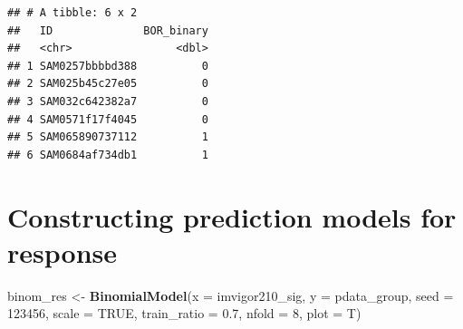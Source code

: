 \documentclass[
  12pt,
]{book}
\newenvironment{Shaded}{\begin{snugshade}}{\end{snugshade}}
\newcommand{\AttributeTok}[1]{\textcolor[rgb]{0.13,0.29,0.53}{#1}}
\newcommand{\ConstantTok}[1]{\textcolor[rgb]{0.56,0.35,0.01}{#1}}
\newcommand{\DecValTok}[1]{\textcolor[rgb]{0.00,0.00,0.81}{#1}}
\newcommand{\FloatTok}[1]{\textcolor[rgb]{0.00,0.00,0.81}{#1}}
\newcommand{\FunctionTok}[1]{\textcolor[rgb]{0.13,0.29,0.53}{\textbf{#1}}}
\newcommand{\NormalTok}[1]{#1}
\newcommand{\OtherTok}[1]{\textcolor[rgb]{0.56,0.35,0.01}{#1}}
\newcommand{\SpecialCharTok}[1]{\textcolor[rgb]{0.81,0.36,0.00}{\textbf{#1}}}
\newcommand{\StringTok}[1]{\textcolor[rgb]{0.31,0.60,0.02}{#1}}
\begin{document}
\begin{Shaded}
\end{Shaded}

\begin{verbatim}
## # A tibble: 6 x 2
##   ID              BOR_binary
##   <chr>                <dbl>
## 1 SAM0257bbbbd388          0
## 2 SAM025b45c27e05          0
## 3 SAM032c642382a7          0
## 4 SAM0571f17f4045          0
## 5 SAM065890737112          1
## 6 SAM0684af734db1          1
\end{verbatim}

\hypertarget{constructing-prediction-models-for-response}{%
\section{Constructing prediction models for response}\label{constructing-prediction-models-for-response}}

\begin{Shaded}
\begin{Highlighting}[]
\NormalTok{binom\_res }\OtherTok{\textless{}{-}} \FunctionTok{BinomialModel}\NormalTok{(}\AttributeTok{x           =}\NormalTok{ imvigor210\_sig, }
                           \AttributeTok{y           =}\NormalTok{ pdata\_group, }
                           \AttributeTok{seed        =} \DecValTok{123456}\NormalTok{, }
                           \AttributeTok{scale       =} \ConstantTok{TRUE}\NormalTok{, }
                           \AttributeTok{train\_ratio =} \FloatTok{0.7}\NormalTok{, }
                           \AttributeTok{nfold       =} \DecValTok{8}\NormalTok{, }
                           \AttributeTok{plot        =}\NormalTok{ T)}
\end{Highlighting}
\end{Shaded}
\end{document}
